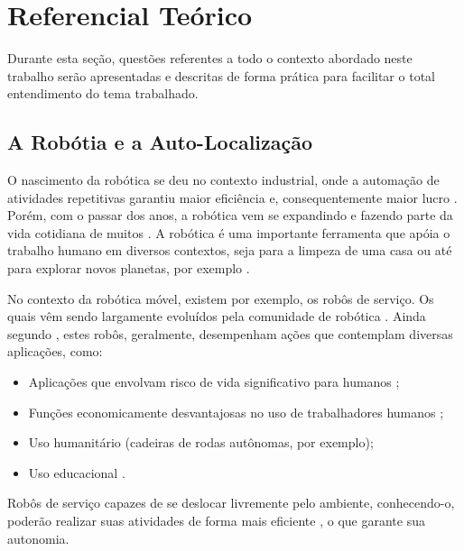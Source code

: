 
\chapter[Referencial Teórico]{Referencial Teórico}
	
	Durante esta seção, questões referentes a todo o contexto abordado neste trabalho serão apresentadas e descritas de forma prática para facilitar o total entendimento do tema trabalhado.

\section{A Robótia e a Auto-Localização}

O nascimento da robótica se deu no contexto industrial, onde a automação de atividades repetitivas garantiu maior eficiência e, consequentemente maior lucro \cite{roboticaIndustrial}. Porém, com o passar dos anos, a robótica vem se expandindo e fazendo parte da vida cotidiana de muitos \cite{teachingWithRoboticKit}. A robótica é uma importante ferramenta que apóia o trabalho humano em diversos contextos, seja para a limpeza de uma casa \cite{melhoramentoServicoLimpeza} ou até para explorar novos planetas, por exemplo \cite{explore_marte}.

No contexto da robótica móvel, existem por exemplo, os robôs de serviço. Os quais vêm sendo largamente evoluídos pela comunidade de robótica \cite{theCleaningProject}. Ainda segundo \cite{theCleaningProject}, estes robôs, geralmente, desempenham ações que contemplam diversas aplicações, como:

\begin{itemize}
	\item Aplicações que envolvam risco de vida significativo para humanos \cite{explore_marte};
	\item Funções economicamente desvantajosas no uso de trabalhadores humanos \cite{roboticaIndustrial};
	\item Uso humanitário (cadeiras de rodas autônomas, por exemplo);
	\item Uso educacional \cite{teachingToolsState-Art}.
\end{itemize} 

Robôs de serviço capazes de se deslocar livremente pelo ambiente, conhecendo-o, poderão realizar suas atividades de forma mais eficiente \cite{theCleaningProject}, o que garante sua autonomia.

